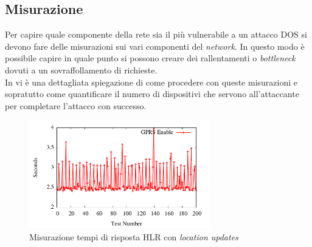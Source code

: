 \subsection{Misurazione}
Per capire quale componente della rete sia il più vulnerabile a un attacco DOS si devono fare delle misurazioni sui vari componenti del \textit{network}.
In questo modo è possibile capire in quale punto si possono creare dei rallentamenti o \textit{bottleneck} dovuti a un sovraffollamento di richieste.\\
In \cite{measuring-dos} vi è una dettagliata spiegazione di come procedere con queste misurazioni e sopratutto come quantificare il numero di dispositivi che 
servono all'attaccante per completare l'attacco con successo.

\begin{figure}[h]
    \centering
    \includegraphics[width=0.7\textwidth]{images/hlr-measuring.png}
    \caption{Misurazione tempi di risposta HLR con \textit{location updates}\cite{measuring-dos}}
\end{figure}